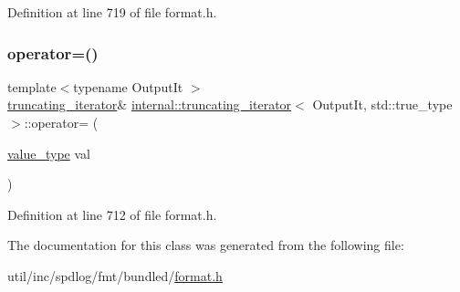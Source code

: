Definition at line 719 of file format.\+h.

\mbox{\label{classinternal_1_1truncating__iterator_3_01_output_it_00_01std_1_1true__type_01_4_a3fd23f1107d8e84d5e9c307f2e187c63}} 
\subsubsection{\texorpdfstring{operator=()}{operator=()}}
{\footnotesize\ttfamily template$<$typename Output\+It $>$ \\
\hyperlink{classinternal_1_1truncating__iterator}{truncating\+\_\+iterator}\& \hyperlink{classinternal_1_1truncating__iterator}{internal\+::truncating\+\_\+iterator}$<$ Output\+It, std\+::true\+\_\+type $>$\+::operator= (\begin{DoxyParamCaption}\item[{\hyperlink{classinternal_1_1truncating__iterator_3_01_output_it_00_01std_1_1true__type_01_4_a4a9bd141b663dc9b2f4cd834b99690ae}{value\+\_\+type}}]{val }\end{DoxyParamCaption})\hspace{0.3cm}{\ttfamily [inline]}}



Definition at line 712 of file format.\+h.



The documentation for this class was generated from the following file\+:\begin{DoxyCompactItemize}
\item 
util/inc/spdlog/fmt/bundled/\hyperlink{format_8h}{format.\+h}\end{DoxyCompactItemize}
